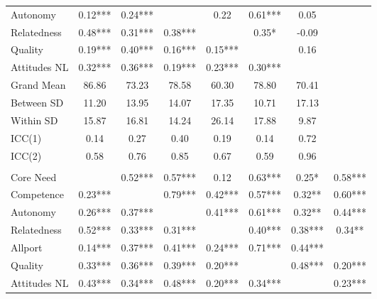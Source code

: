 \begin{table}
\begin{minipage}[t][\textheight][t]{\textwidth}
{\begin{tabular}[t]{lccccccc}
\hspace{1em}Autonomy & 0.12*** & 0.24*** &  & 0.22 & 0.61*** & 0.05 & \\
\hspace{1em}Relatedness & 0.48*** & 0.31*** & 0.38*** &  & 0.35* & -0.09 & \\
\hspace{1em}Quality & 0.19*** & 0.40*** & 0.16*** & 0.15*** &  & 0.16 & \\
\hspace{1em}Attitudes NL & 0.32*** & 0.36*** & 0.19*** & 0.23*** & 0.30*** &  & \\
\addlinespace
\hspace{1em}Grand Mean & 86.86 & 73.23 & 78.58 & 60.30 & 78.80 & 70.41 & \\
\hspace{1em}Between SD & 11.20 & 13.95 & 14.07 & 17.35 & 10.71 & 17.13 & \\
\hspace{1em}Within SD & 15.87 & 16.81 & 14.24 & 26.14 & 17.88 & 9.87 & \\
\hspace{1em}ICC(1) & 0.14 & 0.27 & 0.40 & 0.19 & 0.14 & 0.72 & \\
\hspace{1em}ICC(2) & 0.58 & 0.76 & 0.85 & 0.67 & 0.59 & 0.96 & \\
\addlinespace[0.3em]
\multicolumn{8}{l}{\textbf{Study 3}}\\
\hspace{1em}Core Need &  & 0.52*** & 0.57*** & 0.12 & 0.63*** & 0.25* & 0.58***\\
\hspace{1em}Competence & 0.23*** &  & 0.79*** & 0.42*** & 0.57*** & 0.32** & 0.60***\\
\hspace{1em}Autonomy & 0.26*** & 0.37*** &  & 0.41*** & 0.61*** & 0.32** & 0.44***\\
\hspace{1em}Relatedness & 0.52*** & 0.33*** & 0.31*** &  & 0.40*** & 0.38*** & 0.34**\\
\hspace{1em}Allport & 0.14*** & 0.37*** & 0.41*** & 0.24*** & 0.71*** & 0.44*** & \\
\hspace{1em}Quality & 0.33*** & 0.36*** & 0.39*** & 0.20*** &  & 0.48*** & 0.20***\\
\hspace{1em}Attitudes NL & 0.43*** & 0.34*** & 0.48*** & 0.20*** & 0.34*** &  & 0.23***\\

\end{tabular}}
\end{minipage}
\end{table}
